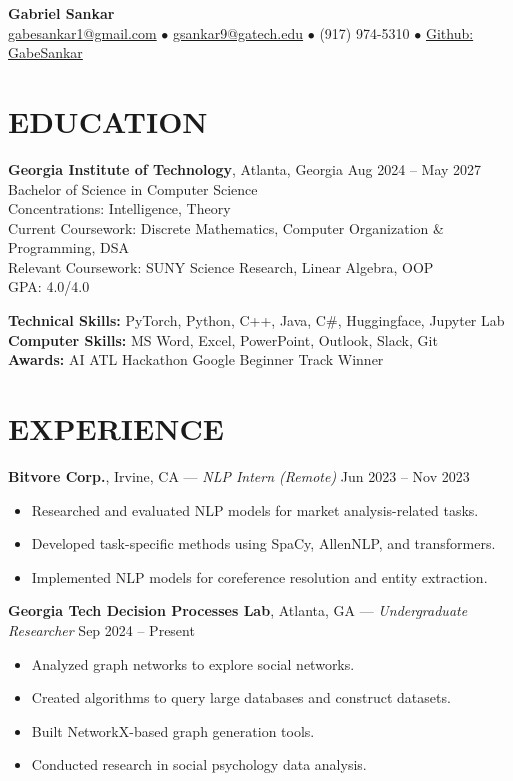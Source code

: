 \documentclass[11pt]{article}
\begin{document}
\begin{center}
    {\LARGE \textbf{Gabriel Sankar}} \\
    \href{mailto:gabesankar1@gmail.com}{gabesankar1@gmail.com} $\bullet$
    \href{mailto:gsankar9@gatech.edu}{gsankar9@gatech.edu} $\bullet$
    (917) 974-5310 $\bullet$
    \href{https://github.com/GabeSankar}{Github: GabeSankar}
\end{center}

\section*{EDUCATION}
\textbf{Georgia Institute of Technology}, Atlanta, Georgia \hfill Aug 2024 -- May 2027 \\
Bachelor of Science in Computer Science \\
Concentrations: Intelligence, Theory \\
Current Coursework: Discrete Mathematics, Computer Organization \& Programming, DSA \\
Relevant Coursework: SUNY Science Research, Linear Algebra, OOP \\
GPA: 4.0/4.0

\vspace{0.3em}
\textbf{Technical Skills:} PyTorch, Python, C++, Java, C\#, Huggingface, Jupyter Lab \\
\textbf{Computer Skills:} MS Word, Excel, PowerPoint, Outlook, Slack, Git \\
\textbf{Awards:} AI ATL Hackathon Google Beginner Track Winner

\section*{EXPERIENCE}
\textbf{Bitvore Corp.}, Irvine, CA --- \textit{NLP Intern (Remote)} \hfill Jun 2023 -- Nov 2023
\begin{itemize}
    \item Researched and evaluated NLP models for market analysis-related tasks.
    \item Developed task-specific methods using SpaCy, AllenNLP, and transformers.
    \item Implemented NLP models for coreference resolution and entity extraction.
\end{itemize}

\textbf{Georgia Tech Decision Processes Lab}, Atlanta, GA --- \textit{Undergraduate Researcher} \hfill Sep 2024 -- Present
\begin{itemize}
    \item Analyzed graph networks to explore social networks.
    \item Created algorithms to query large databases and construct datasets.
    \item Built NetworkX-based graph generation tools.
    \item Conducted research in social psychology data analysis.
\end{itemize}
\end{document}
